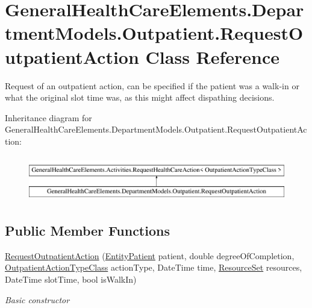 \hypertarget{class_general_health_care_elements_1_1_department_models_1_1_outpatient_1_1_request_outpatient_action}{}\section{General\+Health\+Care\+Elements.\+Department\+Models.\+Outpatient.\+Request\+Outpatient\+Action Class Reference}
\label{class_general_health_care_elements_1_1_department_models_1_1_outpatient_1_1_request_outpatient_action}


Request of an outpatient action, can be specified if the patient was a walk-\/in or what the original slot time was, as this might affect dispathing decisions.  


Inheritance diagram for General\+Health\+Care\+Elements.\+Department\+Models.\+Outpatient.\+Request\+Outpatient\+Action\+:\begin{figure}[H]
\begin{center}
\leavevmode
\includegraphics[height=2.000000cm]{class_general_health_care_elements_1_1_department_models_1_1_outpatient_1_1_request_outpatient_action}
\end{center}
\end{figure}
\subsection*{Public Member Functions}
\begin{DoxyCompactItemize}
\item 
\hyperlink{class_general_health_care_elements_1_1_department_models_1_1_outpatient_1_1_request_outpatient_action_a265f9d7e1c4130f1c78ea6ae9d731a95}{Request\+Outpatient\+Action} (\hyperlink{class_general_health_care_elements_1_1_entities_1_1_entity_patient}{Entity\+Patient} patient, double degree\+Of\+Completion, \hyperlink{class_general_health_care_elements_1_1_general_classes_1_1_action_types_and_paths_1_1_outpatient_action_type_class}{Outpatient\+Action\+Type\+Class} action\+Type, Date\+Time time, \hyperlink{class_general_health_care_elements_1_1_resource_handling_1_1_resource_set}{Resource\+Set} resources, Date\+Time slot\+Time, bool is\+Walk\+In)
\begin{DoxyCompactList}\small\item\em Basic constructor \end{DoxyCompactList}\end{DoxyCompactItemize}
